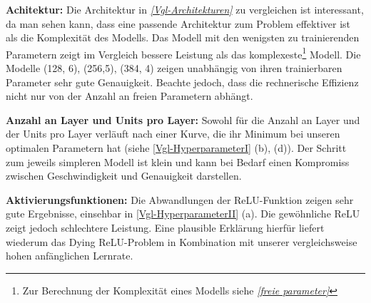 \textbf{Achitektur:} %
Die Architektur in \textit{\autoref{Vgl-Architekturen}} zu vergleichen ist interessant, da man sehen kann, dass eine passende Architektur zum Problem effektiver ist als die Komplexität des Modells. Das Modell mit den wenigsten zu trainierenden Parametern zeigt im Vergleich bessere Leistung als das komplexeste\footnote{Zur Berechnung der Komplexität eines Modells siehe \textit{\autoref{freie parameter}}} Modell. Die Modelle (128, 6), (256,5), (384, 4) zeigen unabhängig von ihren trainierbaren Parameter sehr gute Genauigkeit. Beachte jedoch, dass die rechnerische Effizienz nicht nur von der Anzahl an freien Parametern abhängt. 

\textbf{Anzahl an Layer und Units pro Layer:} %
Sowohl für die Anzahl an Layer und der Units pro Layer verläuft nach einer Kurve, die ihr Minimum bei unseren optimalen Parametern hat (siehe \textsf{\autoref{Vgl-HyperparameterI} (b), (d)}). Der Schritt zum jeweils simpleren Modell ist klein und kann bei Bedarf einen Kompromiss zwischen Geschwindigkeit und Genauigkeit darstellen. 

\textbf{Aktivierungsfunktionen:} %
Die Abwandlungen der ReLU-Funktion zeigen sehr gute Ergebnisse, einsehbar in \textsf{\autoref{Vgl-HyperparameterII} (a)}. Die gewöhnliche ReLU zeigt jedoch schlechtere Leistung. Eine plausible Erklärung hierfür liefert wiederum das \grqq Dying ReLU\grqq-Problem in Kombination mit unserer vergleichsweise hohen anfänglichen Lernrate.  

